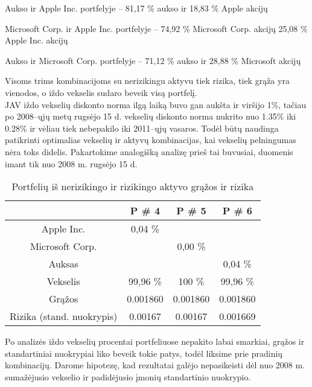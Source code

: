 \documentclass[12pt, a14paper, lithuanian]{article}
\begin{document}
Aukso ir Apple Inc. portfelyje -- 81,17 \% aukso ir 18,83 \% Apple akcijų

Microsoft Corp. ir Apple Inc. portfelyje -- 74,92 \% Microsoft Corp. akcijų  25,08 \% Apple Inc. akcijų

Aukso ir Microsoft Corp. portfelyje -- 71,12 \% aukso ir 28,88 \% Microsoft akcijų

Visoms trims kombinacijoms su nerizikingu aktyvu tiek rizika, tiek grąža yra vienodos, o iždo vekselis sudaro beveik visą portfelį. \\



JAV iždo vekselių diskonto norma ilgą laiką buvo gan aukšta ir viršijo 1\%, tačiau
po 2008--ųjų metų rugsėjo 15 d. vekselių diskonto norma nukrito nuo 1.35\% iki 0.28\% ir vėliau tiek nebepakilo iki 2011--ųjų
vasaros. Todėl būtų naudinga patikrinti optimalias vekselių ir aktyvų kombinacijas, kai vekselių pelningumas
nėra toks didelis. Pakartokime analogišką analizę prieš tai buvusiai, duomenis imant tik nuo 2008 m. rugsėjo 15 d. 

\begin{table}[ht]
\begin{center}
\begin{tabular}{cccc}
  \hline
 & P \# 4 & P \# 5 & P \# 6 \\ 
  \hline
Apple Inc. & 0,04 \% &  &  &  \\
\hline
 Microsoft Corp. &  & 0,00 \% &  &  \\ 
   \hline
   Auksas & & & 0,04 \% &\\
   \hline
   Vekselis & 99,96 \% & 100 \% & 99,96 \% &\\
   \hline
   Grąžos & 0.001860 & 0.001860 & 0.001860 & \\
   \hline
   Rizika (stand. nuokrypis) & 0.00167 & 0.00167 & 0.001669 & \\
   \hline
\end{tabular}
\end{center}
\caption{Portfelių iš nerizikingo ir rizikingo aktyvo grąžos ir rizika}
\end{table}

Po analizės iždo vekselių procentai portfeliuose nepakito labai smarkiai, grąžos ir standartiniai nuokrypiai liko beveik tokie patys, todėl liksime prie pradinių kombinacijų. Darome hipotezę, kad rezultatai galėjo nepasikeisti dėl nuo 2008 m. sumažėjusio vekselio ir padidėjusio įmonių standartinio nuokrypio.
\end{document}

